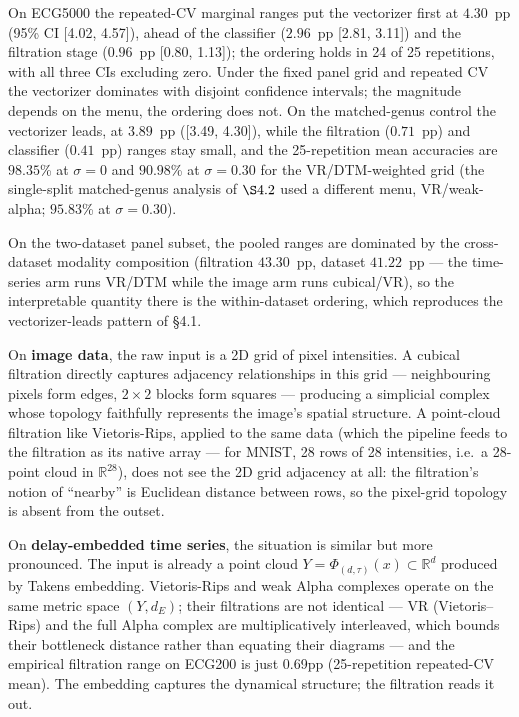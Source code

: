 \documentclass[12pt, a4paper]{report}
\newcommand{\R}{\mathbb{R}}
\theoremstyle{definition}
\theoremstyle{plain}
\theoremstyle{remark}
\begin{document}
On ECG5000 the repeated-CV
marginal ranges put the vectorizer first at $4.30$~pp (95\% CI
[4.02, 4.57]), ahead of the classifier ($2.96$~pp [2.81, 3.11]) and
the filtration stage ($0.96$~pp [0.80, 1.13]); the ordering holds in
24 of 25 repetitions, with all three CIs excluding zero. Under the fixed panel grid and
repeated CV the vectorizer dominates with disjoint confidence
intervals; the magnitude depends on the menu, the ordering does not.
On the matched-genus control the vectorizer leads, at
$3.89$~pp ([3.49, 4.30]), while the filtration ($0.71$~pp) and
classifier ($0.41$~pp) ranges stay small, and the 25-repetition mean accuracies are $98.35$\% at
$\sigma{=}0$ and $90.98$\% at $\sigma{=}0.30$ for the
VR/DTM-weighted grid (the single-split matched-genus analysis of
$\S4.2$ used a different menu, VR/weak-alpha; $95.83$\% at
$\sigma{=}0.30$).

On the two-dataset panel
subset, the pooled ranges are dominated by the cross-dataset modality
composition (filtration $43.30$~pp, dataset $41.22$~pp --- the
time-series arm runs VR/DTM while the image arm runs cubical/VR), so
the interpretable quantity there is the within-dataset ordering, which
reproduces the vectorizer-leads pattern of \S4.1.

On \textbf{image data}, the raw input is a 2D grid of pixel
intensities. A cubical filtration directly captures adjacency
relationships in this grid --- neighbouring pixels form edges,
$2 \times 2$ blocks form squares --- producing a simplicial complex
whose topology faithfully represents the image's spatial structure.
A point-cloud filtration like Vietoris-Rips, applied to the same
data (which the pipeline feeds to the filtration as its native array
--- for MNIST, 28 rows of 28 intensities, i.e.~a 28-point cloud in
$\mathbb{R}^{28}$), does not see the 2D grid adjacency at all: the
filtration's notion of ``nearby'' is Euclidean distance between
rows, so the pixel-grid topology is absent from the outset.

On \textbf{delay-embedded time series}, the situation is similar but
more pronounced. The
input is already a point cloud $Y = \Phi_{(d,\tau)}(x) \subset \R^d$
produced by Takens embedding. Vietoris-Rips and weak Alpha complexes
operate on the same metric space $(Y, d_E)$; their filtrations are
not identical --- VR (Vietoris--Rips) and the full Alpha complex are multiplicatively
interleaved, which bounds their bottleneck distance rather than
equating their diagrams --- and the empirical filtration range on
ECG200 is just 0.69pp (25-repetition repeated-CV mean). The embedding
captures the dynamical structure; the filtration reads it out.
\end{document}
